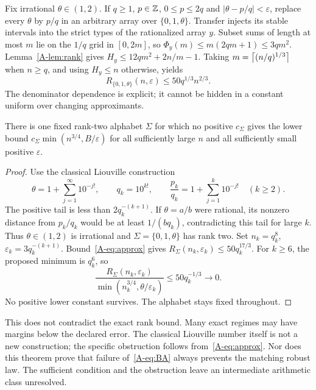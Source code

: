 Fix irrational $\theta\in(1,2)$. If $q\ge1$, $p\in\mathbb Z$, $0\le p\le2q$ and $|\theta-p/q|<\varepsilon$, replace every $\theta$ by $p/q$ in an arbitrary array over $\{0,1,\theta\}$. Transfer injects its stable intervals into the strict types of the rationalized array $y$. Subset sums of length at most $m$ lie on the $1/q$ grid in $[0,2m]$, so $\Phi_y(m)\le m(2qm+1)\le3qm^2$. Lemma~\ref{A-lem:rank} gives $H_y\le12qm^2+2n/m-1$. Taking $m=\left\lceil (n/q)^{1/3}\right\rceil$ when $n\ge q$, and using $H_y\le n$ otherwise, yields
\begin{equation}\label{A-eq:approx}
R_{\{0,1,\theta\}}(n,\varepsilon)\le50q^{1/3}n^{2/3}.
\end{equation}
The denominator dependence is explicit; it cannot be hidden in a constant uniform over changing approximants.

\begin{theorem}\label{A-thm:obstruction}
There is one fixed rank-two alphabet $\Sigma$ for which no positive $c_\Sigma$ gives the lower bound $c_\Sigma\min(n^{3/4},B/\varepsilon)$ for all sufficiently large $n$ and all sufficiently small positive $\varepsilon$.
\end{theorem}
\begin{proof}
Use the classical Liouville construction
\begin{equation}\label{A-eq:liouville}
\theta=1+\sum_{j=1}^{\infty}10^{-j!},\qquad
q_k=10^{k!},\qquad \frac{p_k}{q_k}=1+\sum_{j=1}^k10^{-j!}\quad(k\ge2).
\end{equation}
The positive tail is less than $2q_k^{-(k+1)}$. If $\theta=a/b$ were rational, its nonzero distance from $p_k/q_k$ would be at least $1/(bq_k)$, contradicting this tail for large $k$. Thus $\theta\in(1,2)$ is irrational and $\Sigma=\{0,1,\theta\}$ has rank two. Set $n_k=q_k^8$, $\varepsilon_k=3q_k^{-(k+1)}$. Bound~\eqref{A-eq:approx} gives $R_\Sigma(n_k,\varepsilon_k)\le50q_k^{17/3}$. For $k\ge6$, the proposed minimum is $q_k^6$, so
\begin{equation}\label{A-eq:obstruction}
\frac{R_\Sigma(n_k,\varepsilon_k)}{\min(n_k^{3/4},\theta/\varepsilon_k)}
\le50q_k^{-1/3}\longrightarrow0.
\end{equation}
No positive lower constant survives. The alphabet stays fixed throughout.
\end{proof}
This does not contradict the exact rank bound. Many exact regimes may have margins below the declared error. The classical Liouville number itself is not a new construction; the specific obstruction follows from~\eqref{A-eq:approx}. Nor does this theorem prove that failure of~\eqref{A-eq:BA} always prevents the matching robust law. The sufficient condition and the obstruction leave an intermediate arithmetic class unresolved.

